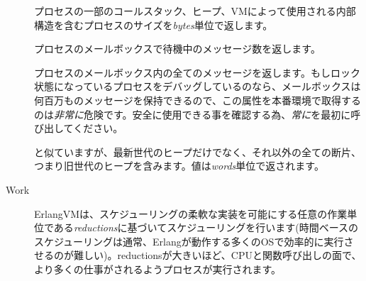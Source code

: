 \begin{description*}
\begin{description}
			\item[] プロセスの一部のコールスタック、ヒープ、VMによって使用される内部構造を含むプロセスのサイズを\emph{bytes}単位で返します。

			\item[] プロセスのメールボックスで待機中のメッセージ数を返します。

			\item[] プロセスのメールボックス内の全てのメッセージを返します。もしロック状態になっているプロセスをデバッグしているのなら、メールボックスは何百万ものメッセージを保持できるので、この属性を本番環境で取得するのは\emph{非常に}危険です。安全に使用できる事を確認する為、\emph{常に}を最初に呼び出してください。

			\item[] と似ていますが、最新世代のヒープだけでなく、それ以外の全ての断片、つまり旧世代のヒープを含みます。値は\emph{words}単位で返されます。
			\end{description}
	\item[Work] \hfill
		\begin{description}
			\item[] ErlangVMは、スケジューリングの柔軟な実装を可能にする任意の作業単位である\emph{reductions}に基づいてスケジューリングを行います(時間ベースのスケジューリングは通常、Erlangが動作する多くのOSで効率的に実行させるのが難しい)。reductionsが大きいほど、CPUと関数呼び出しの面で、より多くの仕事がされるようプロセスが実行されます。
		\end{description}
\end{description*}

